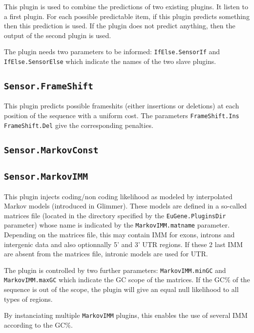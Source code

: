 \documentclass[a4paper,titlepage]{report}
\begin{document}
This plugin is used to combine the predictions of two existing
plugins. It listen to a first plugin. For each possible predictable
item, if this plugin predicts something then this prediction is used.
If the plugin does not predict anything, then the output of the second
plugin is used.
 
The plugin needs two parameters to be informed:
\texttt{IfElse.SensorIf} and \texttt{IfElse.SensorElse} which indicate
the names of the two slave plugins.

\subsection{\texttt{Sensor.FrameShift}}

This plugin predicts possible frameshits (either insertions or
deletions) at each position of the sequence with a uniform cost. The
parameters \texttt{FrameShift.Ins} \texttt{FrameShift.Del} give the
corresponding penalties.

\subsection{\texttt{Sensor.MarkovConst}}



\subsection{\texttt{Sensor.MarkovIMM}}

This plugin injects coding/non coding likelihood as modeled by
interpolated Markov models (introduced in Glimmer). These models are
defined in a so-called matrices file (located in the directory 
specified by the \texttt{EuGene.PluginsDir} parameter) whose name is indicated by the
\texttt{MarkovIMM.matname} parameter. Depending on the matrices file,
this may contain IMM for exons, introns and intergenic data and also
optionnally 5' and 3' UTR regions. If these 2 last IMM are absent from
the matrices file, intronic models are used for UTR.

The plugin is controlled by two further parameters:
\texttt{MarkovIMM.minGC} and \texttt{MarkovIMM.maxGC} which indicate
the GC scope of the matrices. If the GC\% of the sequence is out of
the scope, the plugin will give an equal null likelihood to all types
of regions.

By instanciating multiple \texttt{MarkovIMM} plugins, this enables the use 
of several IMM according to the GC\%.
\end{document}
